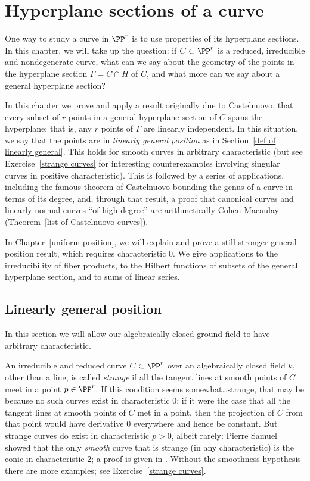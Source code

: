 


\chapter{Hyperplane sections of a curve}\label{linear general position chapter}

One way to study a curve in $\PP^r$ is to use properties of its hyperplane sections. In this chapter, we will take up the question: if $C \subset \PP^r$ is a reduced, irreducible and nondegenerate curve, what can we say about the geometry of the points in the  hyperplane section $\Gamma = C \cap H$ of $C$, and what more can we say about a general hyperplane section?

In this chapter we prove and apply a result originally due to Castelnuovo, that every subset of $r$ points in a
general hyperplane section of $C$ spans the hyperplane; that is, any $r$ points of $\Gamma$ are linearly independent. In this situation, we say that the points are in \emph{linearly general position}
as in Section~\ref{def of linearly general}. This 
holds for smooth curves in arbitrary characteristic (but see Exercise~\ref{strange curves} for
interesting counterexamples involving singular curves in positive characteristic). This is followed by a series of applications,
including the famous theorem of Castelnuovo bounding the genus of a curve in terms of its degree,
and, through that result, a proof that canonical curves and linearly normal curves ``of high degree'' are arithmetically Cohen-Macaulay (Theorem~\ref{list of Castelnuovo curves}).

In Chapter~\ref{uniform position}, we will explain and prove a still stronger general position result, which requires characteristic 0. We give applications to the irreducibility of fiber products, to the Hilbert functions of subsets of the
general hyperplane section, and to sums of linear series.


\section{Linearly general position}\label{linearly general position section}
In this section we will allow our algebraically closed ground field to have arbitrary characteristic. 

An irreducible and reduced curve
$C\subset \PP^r$ over an algebraically closed field $k$, other than a line, is called \emph{strange} if
all the tangent lines at smooth points of $C$ meet in a point $p\in \PP^r$. If this condition seems somewhat\dots strange, that may be because no such curves exist in characteristic 0: if it were the case that all the tangent lines at smooth points of $C$ met in a point, then the projection of $C$ from that point would have derivative 0 everywhere and hence be constant. But strange curves do exist in characteristic $p > 0$, albeit rarely: Pierre Samuel showed that the only \emph{smooth} curve that is strange (in any characteristic) is the conic in characteristic 2; a proof is given in \cite[Theorem IV.3.9]{Hartshorne1977}. Without the smoothness hypothesis there are more examples; see Exercise~\ref{strange curves}.


